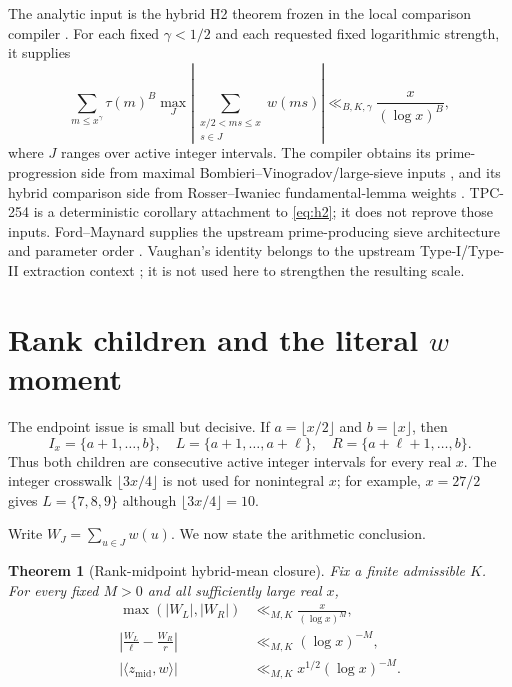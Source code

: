 \documentclass[10pt]{article}
\newtheorem{theorem}{Theorem}
\newcommand{\ip}[2]{\langle #1,#2\rangle}
\newcommand{\zm}{z_{\mathrm{mid}}}
\newcommand{\WL}{W_L}
\newcommand{\WR}{W_R}
\begin{document}
The analytic input is the hybrid H2 theorem frozen in the local comparison
compiler \cite{compiler}.  For each fixed $\gamma<1/2$ and each requested
fixed logarithmic strength, it supplies
\begin{equation}
 \sum_{m\leq x^\gamma}\tau(m)^B\max_J
 \left|\sum_{\substack{x/2<ms\leq x\\s\in J}}w(ms)\right|
 \ll_{B,K,\gamma}\frac{x}{(\log x)^B},                \label{eq:h2}
\end{equation}
where $J$ ranges over active integer intervals.  The compiler obtains its
prime-progression side from maximal Bombieri--Vinogradov/large-sieve inputs
\cite{Bombieri1965,MontgomeryVaughan1973}, and its hybrid comparison side
from Rosser--Iwaniec fundamental-lemma weights \cite{Iwaniec1980Rosser}.
TPC-254 is a deterministic corollary attachment to \eqref{eq:h2}; it does not
reprove those inputs.  Ford--Maynard supplies the upstream prime-producing
sieve architecture and parameter order \cite{FordMaynard2024}.  Vaughan's
identity belongs to the upstream Type-I/Type-II extraction context
\cite{Vaughan1977}; it is not used here to strengthen the resulting scale.

\section{Rank children and the literal \texorpdfstring{$w$}{w} moment}

The endpoint issue is small but decisive.  If
$a=\lfloor x/2\rfloor$ and $b=\lfloor x\rfloor$, then
\begin{equation}
 I_x=\{a+1,\ldots,b\},\quad
 L=\{a+1,\ldots,a+\ell\},\quad
 R=\{a+\ell+1,\ldots,b\}.                            \label{eq:endpoints}
\end{equation}
Thus both children are consecutive active integer intervals for every real
$x$.  The integer crosswalk $\lfloor3x/4\rfloor$ is not used for nonintegral
$x$; for example, $x=27/2$ gives $L=\{7,8,9\}$ although
$\lfloor3x/4\rfloor=10$.

Write $W_J=\sum_{u\in J}w(u)$.  We now state the arithmetic conclusion.

\begin{theorem}[Rank-midpoint hybrid-mean closure]\label{thm:main}
Fix a finite admissible $K$.  For every fixed $M>0$ and all sufficiently
large real $x$,
\begin{align}
 \max(|\WL|,|\WR|)&\ll_{M,K}\frac{x}{(\log x)^M},                    \label{eq:child}\\
 \left|\frac{\WL}{\ell}-\frac{\WR}{r}\right|
   &\ll_{M,K}(\log x)^{-M},                                         \label{eq:means}\\
 |\ip{\zm}w|&\ll_{M,K}x^{1/2}(\log x)^{-M}.                         \label{eq:moment}
\end{align}
\end{theorem}
\end{document}
